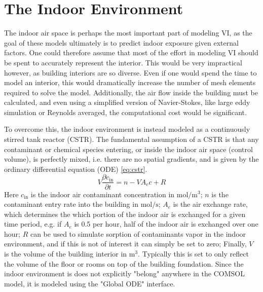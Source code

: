 \section{The Indoor Environment}\label{sec:indoor}

The indoor air space is perhaps the most important part of modeling VI, as the goal of these models ultimately is to predict indoor exposure given external factors.
One could therefore assume that most of the effort in modeling VI should be spent to accurately represent the interior.
This would be very impractical however, as building interiors are so diverse.
Even if one would spend the time to model an interior, this would dramatically increase the number of mesh elements required to solve the model.
Additionally, the air flow inside the building must be calculated, and even using a simplified version of Navier-Stokes, like large eddy simulation or Reynolds averaged, the computational cost would be significant.\par

To overcome this, the indoor environment is instead modeled as a continuously stirred tank reactor (CSTR).
The fundamental assumption of a CSTR is that any contaminant or chemical species entering, or inside the indoor air space (control volume), is perfectly mixed, i.e. there are no spatial gradients, and is given by the ordinary differential equation (ODE) \eqref{eq:cstr}.
\begin{equation}\label{eq:cstr}
  V\frac{\partial c_\mathrm{in}}{\partial t} = n - V A_e c + R
\end{equation}
Here $c_\mathrm{in}$ is the indoor air contaminant concentration in $\mathrm{mol/m^3}$;
$n$ is the contaminant entry rate into the building in $\mathrm{mol/s}$;
$A_e$ is the air exchange rate, which determines the which portion of the indoor air is exchanged for a given time period, e.g. if $A_e$ is 0.5 per hour, half of the indoor air is exchanged over one hour;
$R$ can be used to simulate sorption of contaminants vapor in the indoor environment, and if this is not of interest it can simply be set to zero;
Finally, $V$ is the volume of the building interior in $\mathrm{m^3}$.
Typically this is set to only reflect the volume of the floor or rooms on top of the building foundation.
Since the indoor environment is does not explicitly "belong" anywhere in the COMSOL model, it is modeled using the "Global ODE" interface.\par


